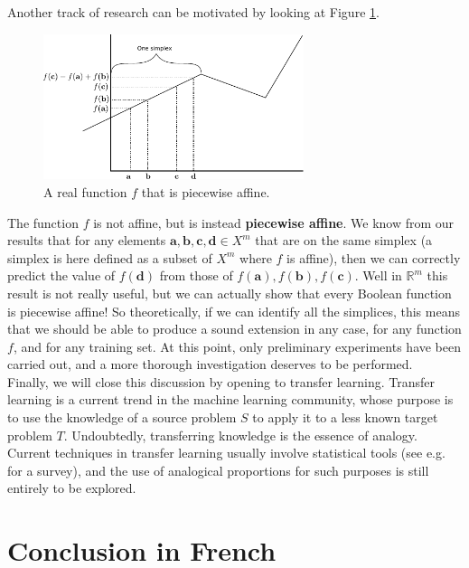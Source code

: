 Another track of research can be motivated by looking at Figure
\ref{FIG:piecewise_affine}.
\begin{figure}[!h]
\centering
  \includegraphics[width=3in]{figures/piecewise_affine.pdf}
  \caption{A real function $f$ that is piecewise affine.}
\label{FIG:piecewise_affine}
\end{figure}
The function $f$ is not affine, but is instead \textbf{piecewise affine}. We
know from our results that for any elements $\mathbf{a}, \mathbf{b},
\mathbf{c}, \mathbf{d} \in X^m$ that are on the same simplex (a simplex is here
defined as a subset of $X^m$ where $f$ is affine), then we can correctly
predict the value of $f(\mathbf{d})$ from those of $f(\mathbf{a}),
f(\mathbf{b}), f(\mathbf{c})$. Well in $\mathbb{R}^m$ this result is not really
useful, but we can actually show that every Boolean function is piecewise
affine! So theoretically, if we can identify all the simplices, this means that
we should be able to produce a sound extension in any case, for any function
$f$, and for any training set. At this point, only preliminary experiments
have been carried out, and a more thorough investigation deserves to be
performed.\\

Finally, we will close this discussion by opening to transfer learning.
Transfer learning is a current trend in the machine learning community, whose
purpose is to use the knowledge of a source problem $S$ to apply it to a less
known target problem $T$. Undoubtedly, transferring knowledge is the essence
of analogy. Current techniques in transfer learning usually involve statistical
tools (see e.g.  \cite{PanYanTKDE10} for a survey), and the use of analogical
proportions for such purposes is still entirely to be explored.

\newpage

\section*{Conclusion in French}


